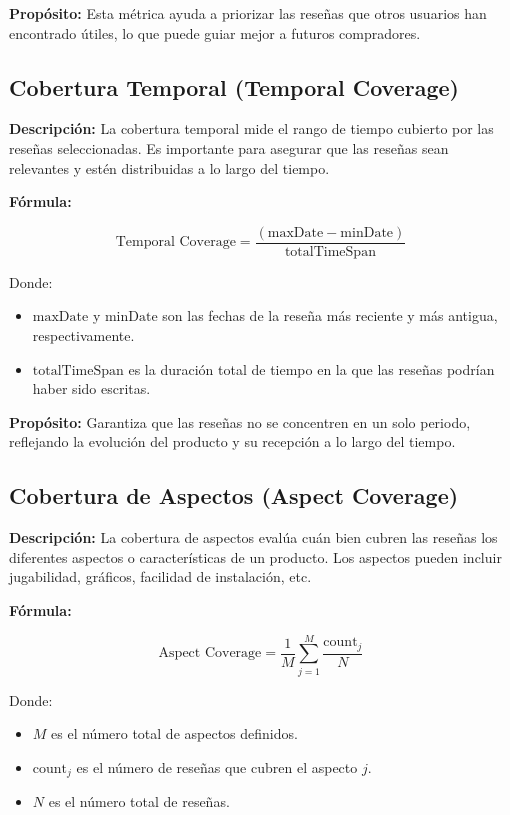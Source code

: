 \documentclass{llncs}
\begin{document}
    \textbf{Propósito:}  
    Esta métrica ayuda a priorizar las reseñas que otros usuarios han encontrado útiles, lo que puede guiar mejor a futuros compradores.

    \subsection{Cobertura Temporal (Temporal Coverage)}

    \textbf{Descripción:}  
    La cobertura temporal mide el rango de tiempo cubierto por las reseñas seleccionadas. Es importante para asegurar que las reseñas sean relevantes y estén distribuidas a lo largo del tiempo.

    \textbf{Fórmula:}

    \[
    \text{Temporal Coverage} = \frac{(\text{maxDate} - \text{minDate})}{\text{totalTimeSpan}}
    \]

    Donde:
    \begin{itemize}
        \item \( \text{maxDate} \) y \( \text{minDate} \) son las fechas de la reseña más reciente y más antigua, respectivamente.
        \item \( \text{totalTimeSpan} \) es la duración total de tiempo en la que las reseñas podrían haber sido escritas.
    \end{itemize}

    \textbf{Propósito:}  
    Garantiza que las reseñas no se concentren en un solo periodo, reflejando la evolución del producto y su recepción a lo largo del tiempo.

    \subsection{Cobertura de Aspectos (Aspect Coverage)}

    \textbf{Descripción:}  
    La cobertura de aspectos evalúa cuán bien cubren las reseñas los diferentes aspectos o características de un producto. Los aspectos pueden incluir jugabilidad, gráficos, facilidad de instalación, etc.

    \textbf{Fórmula:}

    \[
    \text{Aspect Coverage} = \frac{1}{M} \sum_{j=1}^{M} \frac{\text{count}_{j}}{N}
    \]

    Donde:
    \begin{itemize}
        \item \( M \) es el número total de aspectos definidos.
        \item \( \text{count}_{j} \) es el número de reseñas que cubren el aspecto \( j \).
        \item \( N \) es el número total de reseñas.
    \end{itemize}
\end{document}
